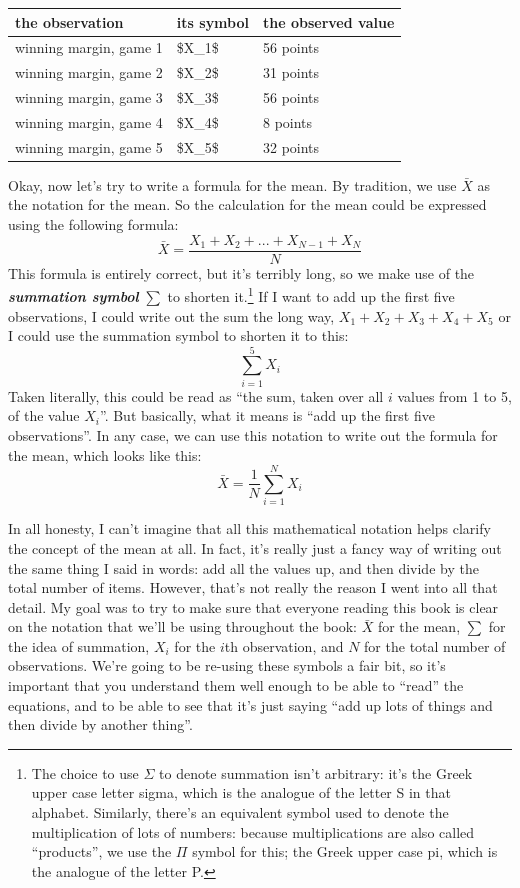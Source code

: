 \documentclass[
]{book}
\begin{document}
\begin{tabular}{lll}
\toprule
the observation & its symbol & the observed value\\
\midrule
winning margin, game 1 & \$X\_1\$ & 56 points\\
winning margin, game 2 & \$X\_2\$ & 31 points\\
winning margin, game 3 & \$X\_3\$ & 56 points\\
winning margin, game 4 & \$X\_4\$ & 8 points\\
winning margin, game 5 & \$X\_5\$ & 32 points\\
\bottomrule
\end{tabular}

Okay, now let's try to write a formula for the mean. By tradition, we use \(\bar{X}\) as the notation for the mean. So the calculation for the mean could be expressed using the following formula:
\[
\bar{X} = \frac{X_1 + X_2 + ... + X_{N-1} + X_N}{N}
\]
This formula is entirely correct, but it's terribly long, so we make use of the \textbf{\emph{summation symbol}} \(\scriptstyle\sum\) to shorten it.\footnote{The choice to use \(\Sigma\) to denote summation isn't arbitrary: it's the Greek upper case letter sigma, which is the analogue of the letter S in that alphabet. Similarly, there's an equivalent symbol used to denote the multiplication of lots of numbers: because multiplications are also called ``products'', we use the \(\Pi\) symbol for this; the Greek upper case pi, which is the analogue of the letter P.} If I want to add up the first five observations, I could write out the sum the long way, \(X_1 + X_2 + X_3 + X_4 +X_5\) or I could use the summation symbol to shorten it to this:
\[
\sum_{i=1}^5 X_i
\]
Taken literally, this could be read as ``the sum, taken over all \(i\) values from 1 to 5, of the value \(X_i\)''. But basically, what it means is ``add up the first five observations''. In any case, we can use this notation to write out the formula for the mean, which looks like this:
\[
\bar{X} = \frac{1}{N} \sum_{i=1}^N X_i 
\]

In all honesty, I can't imagine that all this mathematical notation helps clarify the concept of the mean at all. In fact, it's really just a fancy way of writing out the same thing I said in words: add all the values up, and then divide by the total number of items. However, that's not really the reason I went into all that detail. My goal was to try to make sure that everyone reading this book is clear on the notation that we'll be using throughout the book: \(\bar{X}\) for the mean, \(\scriptstyle\sum\) for the idea of summation, \(X_i\) for the \(i\)th observation, and \(N\) for the total number of observations. We're going to be re-using these symbols a fair bit, so it's important that you understand them well enough to be able to ``read'' the equations, and to be able to see that it's just saying ``add up lots of things and then divide by another thing''.
\end{document}
